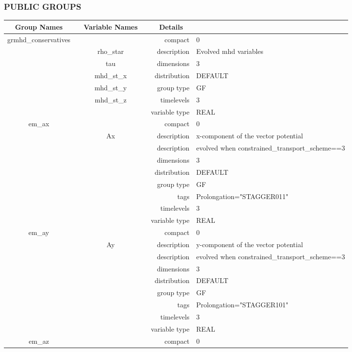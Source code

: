 \vspace{5mm}\subsubsection{PUBLIC GROUPS}

\vspace{5mm}

\begin{tabular*}{150mm}{|c|c@{\extracolsep{\fill}}|rl|} \hline 
~ {\bf Group Names} ~ & ~ {\bf Variable Names} ~  &{\bf Details} ~ & ~\\ 
\hline 
grmhd\_conservatives &  & compact & 0 \\ 
 & rho\_star & description & Evolved mhd variables \\ 
 & tau & dimensions & 3 \\ 
 & mhd\_st\_x & distribution & DEFAULT \\ 
 & mhd\_st\_y & group type & GF \\ 
 & mhd\_st\_z & timelevels & 3 \\ 
 &  & variable type & REAL \\ 
\hline 
em\_ax &  & compact & 0 \\ 
 & Ax & description & x-component of the vector potential \\ 
& ~ & description &  evolved when constrained\_transport\_scheme==3 \\ 
 &  & dimensions & 3 \\ 
 &  & distribution & DEFAULT \\ 
 &  & group type & GF \\ 
 &  & tags & Prolongation="STAGGER011" \\ 
 &  & timelevels & 3 \\ 
 &  & variable type & REAL \\ 
\hline 
em\_ay &  & compact & 0 \\ 
 & Ay & description & y-component of the vector potential \\ 
& ~ & description &  evolved when constrained\_transport\_scheme==3 \\ 
 &  & dimensions & 3 \\ 
 &  & distribution & DEFAULT \\ 
 &  & group type & GF \\ 
 &  & tags & Prolongation="STAGGER101" \\ 
 &  & timelevels & 3 \\ 
 &  & variable type & REAL \\ 
\hline 
em\_az &  & compact & 0 \\ 

\end{tabular*}

